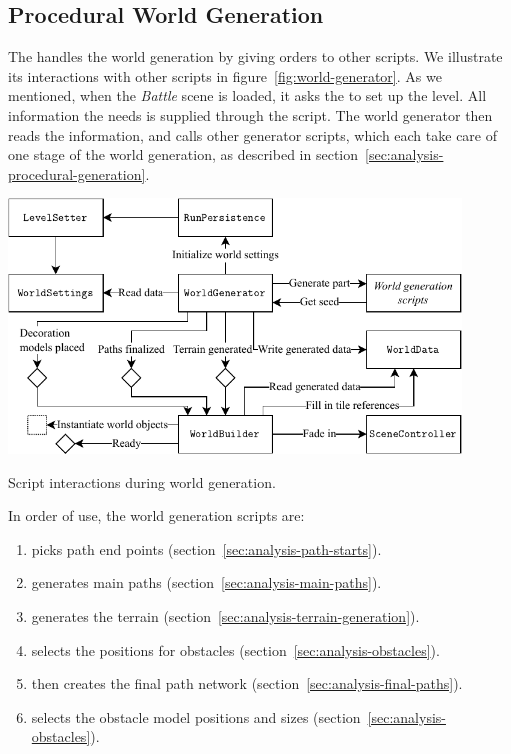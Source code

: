 \subsection{Procedural World Generation}\label{sec:docs-world-generation}

The  handles the world generation by giving orders to other scripts.
We illustrate its interactions with other scripts in figure~\ref{fig:world-generator}.
As we mentioned, when the \emph{Battle} scene is loaded, it asks the  to set up the level.
All information the  needs is supplied through the  script.
The world generator then reads the information, and calls other generator scripts, which each take care of one stage of the world generation, as described in section~\ref{sec:analysis-procedural-generation}.

\begin{center}
    \captionsetup{type=figure}
    \includegraphics[width=0.9\textwidth]{img/world generator.pdf}
    \caption{Script interactions during world generation.}
    \label{fig:world-generator}
\end{center}

In order of use, the world generation scripts are:
\begin{enumerate}
    \item {} picks path end points (section~\ref{sec:analysis-path-starts}).
    \item {} generates main paths (section~\ref{sec:analysis-main-paths}).
    \item {} generates the terrain (section~\ref{sec:analysis-terrain-generation}).
    \item {} selects the positions for obstacles (section~\ref{sec:analysis-obstacles}).
    \item {} then creates the final path network (section~\ref{sec:analysis-final-paths}).
    \item {} selects the obstacle model positions and sizes (section~\ref{sec:analysis-obstacles}).
\end{enumerate}

